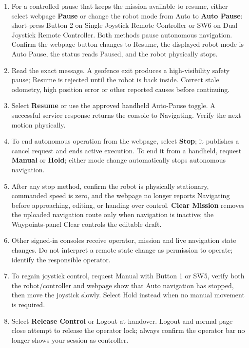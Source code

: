 \documentclass[
  10pt,
  letterpaper,
  openany]{report}
\providecommand{\tightlist}{%
  \setlength{\itemsep}{0pt}\setlength{\parskip}{0pt}}
\begin{document}
\begin{enumerate}
\tightlist
\item
  For a controlled pause that keeps the mission available to resume,
  either select webpage \textbf{Pause} or change the robot mode from
  Auto to \textbf{Auto Pause}: short-press Button 2 on Single Joystick
  Remote Controller or SW6 on Dual Joystick Remote Controller. Both
  methods pause autonomous navigation. Confirm the webpage button
  changes to Resume, the displayed robot mode is Auto Pause, the status
  reads Paused, and the robot physically stops.
\item
  Read the exact message. A geofence exit produces a high-visibility
  safety pause; Resume is rejected until the robot is back inside.
  Correct stale odometry, high position error or other reported causes
  before continuing.
\item
  Select \textbf{Resume} or use the approved handheld Auto-Pause toggle.
  A successful service response returns the console to Navigating.
  Verify the next motion physically.
\item
  To end autonomous operation from the webpage, select \textbf{Stop}; it
  publishes a cancel request and ends active execution. To end it from a
  handheld, request \textbf{Manual} or \textbf{Hold}; either mode change
  automatically stops autonomous navigation.
\item
  After any stop method, confirm the robot is physically stationary,
  commanded speed is zero, and the webpage no longer reports Navigating
  before approaching, editing, or handing over control. \textbf{Clear
  Mission} removes the uploaded navigation route only when navigation is
  inactive; the Waypoints-panel Clear controls the editable draft.
\item
  Other signed-in consoles receive operator, mission and live navigation
  state changes. Do not interpret a remote state change as permission to
  operate; identify the responsible operator.
\item
  To regain joystick control, request Manual with Button 1 or SW5,
  verify both the robot/controller and webpage show that Auto navigation
  has stopped, then move the joystick slowly. Select Hold instead when
  no manual movement is required.
\item
  Select \textbf{Release Control} or Logout at handover. Logout and
  normal page close attempt to release the operator lock; always confirm
  the operator bar no longer shows your session as controller.
\end{enumerate}
\end{document}
